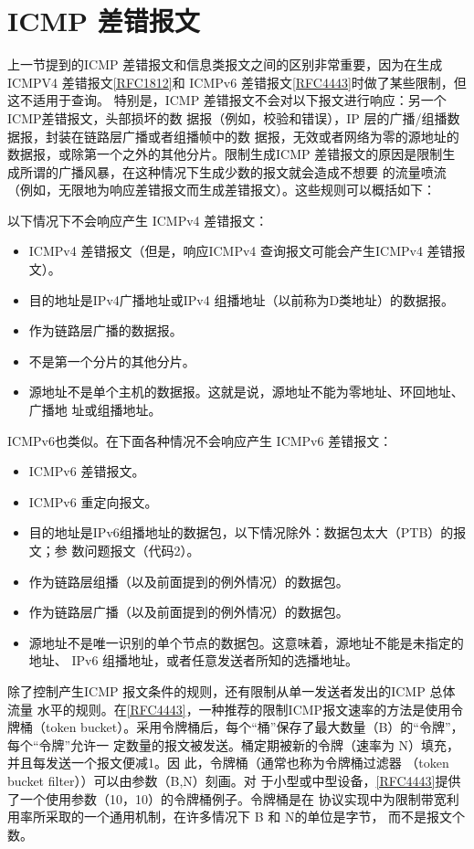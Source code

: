 \section{ICMP 差错报文}

上一节提到的ICMP 差错报文和信息类报文之间的区别非常重要，因为在生成ICMPV4
差错报文\href{https://www.rfc-editor.org/rfc/rfc1812}{[RFC1812]}和 ICMPv6 差错报文\href{https://www.rfc-editor.org/rfc/rfc4443}{[RFC4443]}时做了某些限制，但这不适用于查询。
特别是，ICMP 差错报文不会对以下报文进行响应：另一个ICMP差错报文，头部损坏的数
据报（例如，校验和错误），IP 层的广播/组播数据报，封装在链路层广播或者组播帧中的数
据报，无效或者网络为零的源地址的数据报，或除第一个之外的其他分片。限制生成ICMP
差错报文的原因是限制生成所谓的广播风暴，在这种情况下生成少数的报文就会造成不想要
的流量喷流（例如，无限地为响应差错报文而生成差错报文）。这些规则可以概括如下：

以下情况下不会响应产生 ICMPv4 差错报文：
\begin{itemize}
	\item ICMPv4 差错报文（但是，响应ICMPv4 查询报文可能会产生ICMPv4 差错报文）。
	\item 目的地址是IPv4广播地址或IPv4 组播地址（以前称为D类地址）的数据报。
	\item 作为链路层广播的数据报。
	\item 不是第一个分片的其他分片。
	\item 源地址不是单个主机的数据报。这就是说，源地址不能为零地址、环回地址、广播地
	      址或组播地址。
\end{itemize}

ICMPv6也类似。在下面各种情况不会响应产生 ICMPv6 差错报文：
\begin{itemize}
	\item ICMPv6 差错报文。
	\item ICMPv6 重定向报文。
	\item 目的地址是IPv6组播地址的数据包，以下情况除外：数据包太大（PTB）的报文；参
	      数问题报文（代码2）。
	\item 作为链路层组播（以及前面提到的例外情况）的数据包。
	\item 作为链路层广播（以及前面提到的例外情况）的数据包。
	\item 源地址不是唯一识别的单个节点的数据包。这意味着，源地址不能是未指定的地址、
	      IPv6 组播地址，或者任意发送者所知的选播地址。
\end{itemize}

除了控制产生ICMP 报文条件的规则，还有限制从单一发送者发出的ICMP 总体流量
水平的规则。在\href{https://www.rfc-editor.org/rfc/rfc4443}{[RFC4443]}，一种推荐的限制ICMP报文速率的方法是使用令牌桶（token
bucket）。采用令牌桶后，每个“桶”保存了最大数量（B）的“令牌”，每个“令牌”允许一
定数量的报文被发送。桶定期被新的令牌（速率为 N）填充，并且每发送一个报文便减1。因
此，令牌桶（通常也称为令牌桶过滤器 （token bucket filter））可以由参数（B,N）刻画。对
于小型或中型设备，\href{https://www.rfc-editor.org/rfc/rfc4443}{[RFC4443]}提供了一个使用参数（10，10）的令牌桶例子。令牌桶是在
协议实现中为限制带宽利用率所采取的一个通用机制，在许多情况下 B 和 N的单位是字节，
而不是报文个数。

